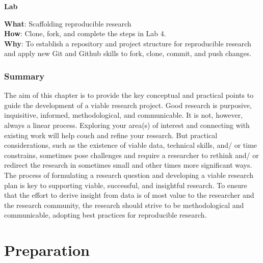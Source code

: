 \documentclass[
  letterpaper,
  krantz1]{latex/krantz-mod}
\theoremstyle{definition}
\theoremstyle{definition}
\theoremstyle{remark}
\begin{document}
\begin{tcolorbox}[enhanced jigsaw, toprule=.15mm, breakable, colback=white, arc=.35mm, left=2mm, colframe=quarto-callout-color-frame, opacityback=0, bottomrule=.15mm, rightrule=.15mm, leftrule=.75mm]

\textbf{ Lab}

\textbf{What}: Scaffolding reproducible research\\
\textbf{How}: Clone, fork, and complete the steps in Lab 4.\\
\textbf{Why}: To establish a repository and project structure for
reproducible research and apply new Git and Github skills to fork,
clone, commit, and push changes.

\end{tcolorbox}

\section*{Summary}\label{summary-3}


The aim of this chapter is to provide the key conceptual and practical
points to guide the development of a viable research project. Good
research is purposive, inquisitive, informed, methodological, and
communicable. It is not, however, always a linear process. Exploring
your area(s) of interest and connecting with existing work will help
couch and refine your research. But practical considerations, such as
the existence of viable data, technical skills, and/ or time constrains,
sometimes pose challenges and require a researcher to rethink and/ or
redirect the research in sometimes small and other times more
significant ways. The process of formulating a research question and
developing a viable research plan is key to supporting viable,
successful, and insightful research. To ensure that the effort to derive
insight from data is of most value to the researcher and the research
community, the research should strive to be methodological and
communicable, adopting best practices for reproducible research.

\part{Preparation}
\end{document}
